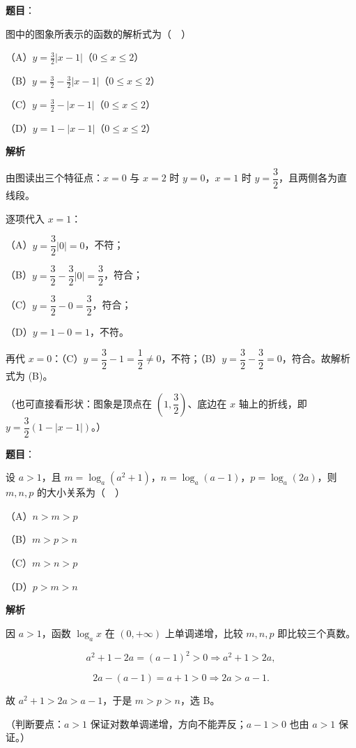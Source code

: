 \begin{answer}

\textbf{题目}：

图中的图象所表示的函数的解析式为（　）
\nopagebreak[4]
\begin{center}\end{center}
\nopagebreak[4]
（A）$y=\frac32|x-1|$（$0\leqslant x\leqslant2$）

（B）$y=\frac32-\frac32|x-1|$（$0\leqslant x\leqslant2$）

（C）$y=\frac32-|x-1|$（$0\leqslant x\leqslant2$）

（D）$y=1-|x-1|$（$0\leqslant x\leqslant2$）

\textbf{解析}

由图读出三个特征点：$x=0$ 与 $x=2$ 时 $y=0$，$x=1$ 时 $y=\dfrac32$，且两侧各为直线段。

逐项代入 $x=1$：

（A）$y=\dfrac32|0|=0$，不符；

（B）$y=\dfrac32-\dfrac32|0|=\dfrac32$，符合；

（C）$y=\dfrac32-0=\dfrac32$，符合；

（D）$y=1-0=1$，不符。

再代 $x=0$：（C）$y=\dfrac32-1=\dfrac12\neq0$，不符；（B）$y=\dfrac32-\dfrac32=0$，符合。故解析式为 (B)。

（也可直接看形状：图象是顶点在 $\left(1,\dfrac32\right)$、底边在 $x$ 轴上的折线，即 $y=\dfrac32\left(1-|x-1|\right)$。）


\end{answer}
\begin{answer}

\textbf{题目}：

设 $a>1$，且 $m=\log_a(a^2+1)$，$n=\log_a(a-1)$，$p=\log_a(2a)$，则 $m,n,p$ 的大小关系为（　）

（A）$n>m>p$

（B）$m>p>n$

（C）$m>n>p$

（D）$p>m>n$

\textbf{解析}

因 $a>1$，函数 $\log_a x$ 在 $(0,+\infty)$ 上单调递增，比较 $m,n,p$ 即比较三个真数。

\nopagebreak[4]
\[a^2+1-2a=(a-1)^2>0\Longrightarrow a^2+1>2a,\]

\nopagebreak[4]
\[2a-(a-1)=a+1>0\Longrightarrow 2a>a-1.\]

故 $a^2+1>2a>a-1$，于是 $m>p>n$，选 B。

（判断要点：$a>1$ 保证对数单调递增，方向不能弄反；$a-1>0$ 也由 $a>1$ 保证。）


\end{answer}

